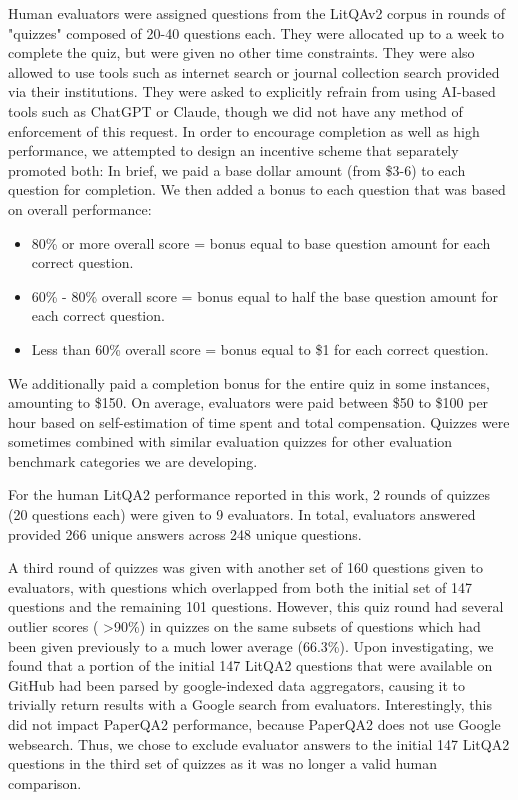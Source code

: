 \documentclass{article}
\begin{document}
Human evaluators were assigned questions from the LitQAv2 corpus in rounds of "quizzes" composed of 20-40 questions each. They were allocated up to a week to complete the quiz, but were given no other time constraints. They were also allowed to use tools such as internet search or journal collection search provided via their institutions. They were asked to explicitly refrain from using AI-based tools such as ChatGPT or Claude, though we did not have any method of enforcement of this request. In order to encourage completion as well as high performance, we attempted to design an incentive scheme that separately promoted both: In brief, we paid a base dollar amount (from \$3-6) to each question for completion. We then added a bonus to each question that was based on overall performance: 
\begin{itemize}
    \item{80\% or more overall score = bonus equal to base question amount for each correct question.}
    \item{60\% - 80\% overall score = bonus equal to half the base question amount for each correct question.}
    \item{Less than 60\% overall score = bonus equal to \$1 for each correct question.}
\end{itemize}

We additionally paid a completion bonus for the entire quiz in some instances, amounting to \$150. On average, evaluators were paid between \$50 to \$100 per hour based on self-estimation of time spent and total compensation. Quizzes were sometimes combined with similar evaluation quizzes for other evaluation benchmark categories we are developing.

For the human LitQA2 performance reported in this work, 2 rounds of quizzes (20 questions each) were given to 9 evaluators. In total, evaluators answered provided 266 unique answers across 248 unique questions.

A third round of quizzes was given with another set of 160 questions given to evaluators, with questions which overlapped from both the initial set of 147 questions and the remaining 101 questions. However, this quiz round had several outlier scores ( >90\%) in quizzes on the same subsets of questions which had been given previously to a much lower average (66.3\%). Upon investigating, we found that a portion of the initial 147 LitQA2 questions that were available on GitHub had been parsed by google-indexed data aggregators, causing it to trivially return results with a Google search from evaluators. Interestingly, this did not impact PaperQA2 performance, because PaperQA2 does not use Google websearch. Thus, we chose to exclude evaluator answers to the initial 147 LitQA2 questions in the third set of quizzes as it was no longer a valid human comparison.
\end{document}
